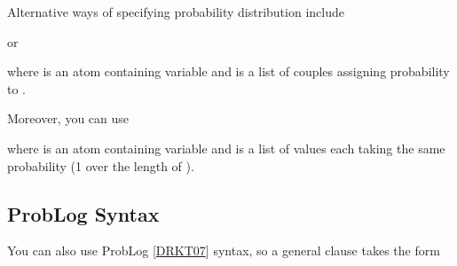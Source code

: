 \documentclass[letterpaper,10pt,english]{sphinxmanual}
\begin{document}
\sphinxAtStartPar
Alternative ways of specifying probability distribution include

\begin{sphinxVerbatim}[commandchars=\\\{\}]
\end{sphinxVerbatim}

\sphinxAtStartPar
or

\begin{sphinxVerbatim}[commandchars=\\\{\}]
\end{sphinxVerbatim}

\sphinxAtStartPar
where  is an atom containing variable  and  is a list of couples  assigning probability  to .

\sphinxAtStartPar
Moreover, you can use

\begin{sphinxVerbatim}[commandchars=\\\{\}]
\end{sphinxVerbatim}

\sphinxAtStartPar
where  is an atom containing variable  and  is a list of values each taking the same probability (1 over the length of ).


\subsection{ProbLog Syntax}
\label{\detokenize{index:problog-syntax}}
\sphinxAtStartPar
You can also use ProbLog {[}\hyperlink{cite.index:id46}{DRKT07}{]} syntax, so a general clause takes the form

\begin{sphinxVerbatim}[commandchars=\\\{\}]
      
\end{sphinxVerbatim}
\end{document}

